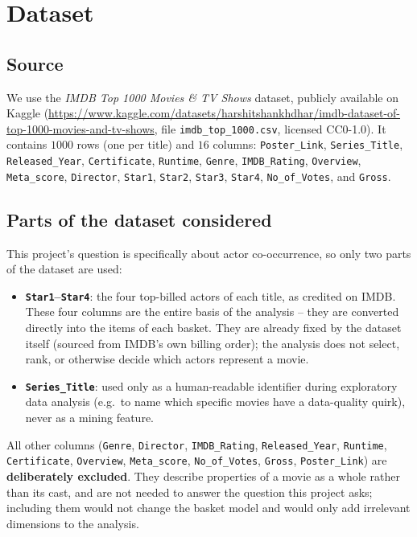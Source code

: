 \documentclass[11pt,a4paper]{article}
\begin{document}
\section{Dataset}
\label{sec:dataset}

\subsection{Source}

We use the \emph{IMDB Top 1000 Movies \& TV Shows} dataset, publicly available
on Kaggle
(\url{https://www.kaggle.com/datasets/harshitshankhdhar/imdb-dataset-of-top-1000-movies-and-tv-shows},
file \texttt{imdb\_top\_1000.csv}, licensed CC0-1.0). It contains $1000$ rows
(one per title) and $16$ columns: \texttt{Poster\_Link}, \texttt{Series\_Title},
\texttt{Released\_Year}, \texttt{Certificate}, \texttt{Runtime}, \texttt{Genre},
\texttt{IMDB\_Rating}, \texttt{Overview}, \texttt{Meta\_score},
\texttt{Director}, \texttt{Star1}, \texttt{Star2}, \texttt{Star3},
\texttt{Star4}, \texttt{No\_of\_Votes}, and \texttt{Gross}.

\subsection{Parts of the dataset considered}

This project's question is specifically about actor co-occurrence, so only two
parts of the dataset are used:

\begin{itemize}
    \item \textbf{\texttt{Star1}--\texttt{Star4}}: the four top-billed actors
    of each title, as credited on IMDB. These four columns are the entire
    basis of the analysis -- they are converted directly into the items of
    each basket. They are already fixed by
    the dataset itself (sourced from IMDB's own billing order); the analysis
    does not select, rank, or otherwise decide which actors represent a movie.
    \item \textbf{\texttt{Series\_Title}}: used only as a human-readable
    identifier during exploratory data analysis (e.g.\ to name which specific
    movies have a data-quality quirk), never
    as a mining feature.
\end{itemize}

All other columns (\texttt{Genre}, \texttt{Director}, \texttt{IMDB\_Rating},
\texttt{Released\_Year}, \texttt{Runtime}, \texttt{Certificate},
\texttt{Overview}, \texttt{Meta\_score}, \texttt{No\_of\_Votes},
\texttt{Gross}, \texttt{Poster\_Link}) are \textbf{deliberately excluded}.
They describe properties of a movie as a whole rather than its cast, and are
not needed to answer the question this project asks; including them would not
change the basket model and would only add irrelevant dimensions to the
analysis.
\end{document}
